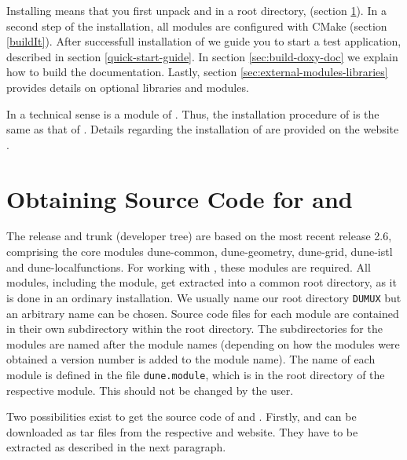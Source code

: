 
Installing \Dumux means that you first unpack \Dune and \Dumux in a root directory,
(section \ref{sc:ObtainingSourceCode}).
In a second step of the installation, all modules are configured with CMake
(section \ref{buildIt}).
After successfull installation of \Dumux we guide you to start a test application,
described in section \ref{quick-start-guide}.
In section \ref{sec:build-doxy-doc} we explain how to build the \Dumux documentation.
Lastly, section \ref{sec:external-modules-libraries} provides details on optional libraries and modules.

In a technical sense \Dumux is a module of \Dune.
Thus, the installation procedure of \Dumux is the same as that of \Dune.
Details regarding the installation of \Dune are provided on the \Dune website \cite{DUNE-HP}.


\section{Obtaining Source Code for \Dune and \Dumux}
\label{sc:ObtainingSourceCode}
The \Dumux release and trunk (developer tree) are based on the most recent
\Dune release 2.6, comprising the core modules dune-common, dune-geometry, dune-grid,
dune-istl and dune-localfunctions. For working with \Dumux, these modules are required.
All \Dune modules, including the \Dumux module, get extracted into a common root directory, as it
is done in an ordinary \Dune installation.
We usually name our root directory \texttt{DUMUX} but an arbitrary name can be chosen.
Source code files for each \Dune module are contained in their own subdirectory within the root directory.
The subdirectories for the modules are named after the module names (depending on how
the modules were obtained a version number is added to the module name).
The name of each \Dune module is defined in the file \texttt{dune.module}, which is
in the root directory of the respective module. This should not be changed by the user.

Two possibilities exist to get the source code of \Dune and \Dumux.
Firstly, \Dune and \Dumux can be downloaded as tar files from the respective \Dune and \Dumux website.
They have to be extracted as described in the next paragraph.


